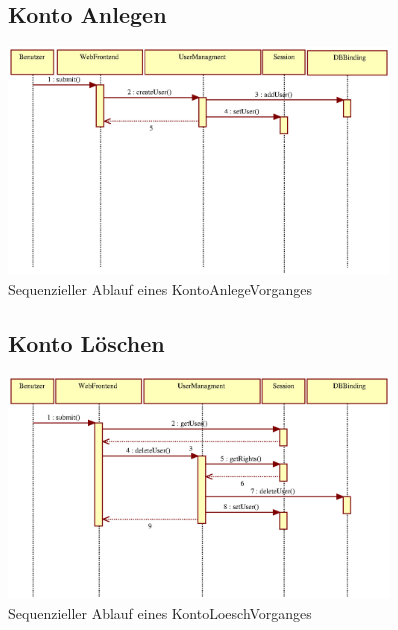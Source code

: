 \documentclass[a4paper,11pt]{scrartcl}
\begin{document}
\begin{figure}[htbp]
\subsection{Konto Anlegen}
		\centering
		\includegraphics[width=0.90\textwidth]{images/seq03_KontoAnlegen.eps}
		\caption{Sequenzieller Ablauf eines KontoAnlegeVorganges}
		\label{seq03}
\end{figure}


\begin{figure}[htbp]
\subsection{Konto Löschen}
		\centering
		\includegraphics[width=0.90\textwidth]{images/seq04_KontoLoeschen.eps}
		\caption{Sequenzieller Ablauf eines KontoLoeschVorganges}
		\label{seq04}
\end{figure}
\end{document}
